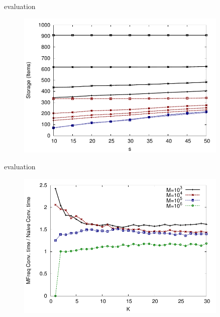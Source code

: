 \begin{frame}{\FreqMF evaluation}

\begin{figure}
\includegraphics[width=0.9\textwidth]{msgstorage.pdf}
\end{figure}

\end{frame}

\begin{frame}{\FreqMF evaluation}

\begin{figure}
\includegraphics[width=0.9\textwidth]{msgratio.pdf}
\end{figure}

\end{frame}



\begin{RMFrame}

\BI
\item {}
\item {}
\EI

\end{RMFrame}

